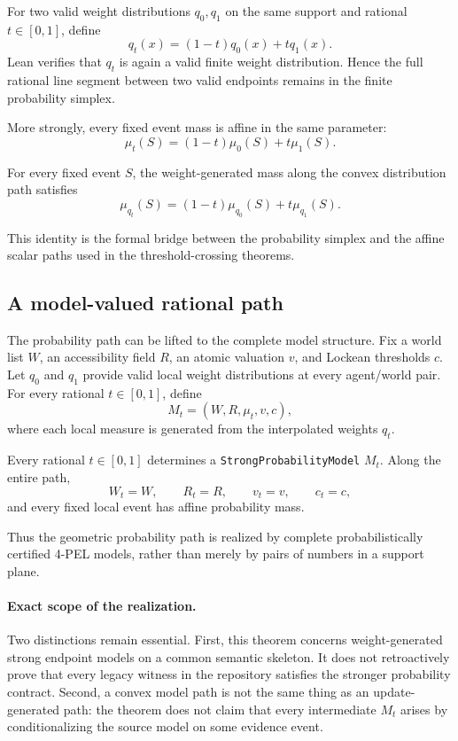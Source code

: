 For two valid weight distributions \(q_0,q_1\) on the same support and rational \(t\in[0,1]\), define
\[
  q_t(x)=(1-t)q_0(x)+tq_1(x).
\]
Lean verifies that \(q_t\) is again a valid finite weight distribution. Hence the full rational line segment between two valid endpoints remains in the finite probability simplex.

More strongly, every fixed event mass is affine in the same parameter:
\[
  \mu_t(S)
  =(1-t)\mu_0(S)+t\mu_1(S).
\]

\begin{theorem}
For every fixed event \(S\), the weight-generated mass along the convex distribution path satisfies
\[
  \mu_{q_t}(S)
  =(1-t)\mu_{q_0}(S)+t\mu_{q_1}(S).
\]
\statusverified
\end{theorem}

This identity is the formal bridge between the probability simplex and the affine scalar paths used in the threshold-crossing theorems.

\subsection{A model-valued rational path}

The probability path can be lifted to the complete model structure. Fix a world list \(W\), an accessibility field \(R\), an atomic valuation \(v\), and Lockean thresholds \(c\). Let \(q_0\) and \(q_1\) provide valid local weight distributions at every agent/world pair. For every rational \(t\in[0,1]\), define
\[
  M_t=(W,R,\mu_t,v,c),
\]
where each local measure is generated from the interpolated weights \(q_t\).

\begin{theorem}
Every rational \(t\in[0,1]\) determines a \texttt{StrongProbabilityModel} \(M_t\). Along the entire path,
\[
  W_t=W,
  \qquad
  R_t=R,
  \qquad
  v_t=v,
  \qquad
  c_t=c,
\]
and every fixed local event has affine probability mass.
\statusverified
\end{theorem}

Thus the geometric probability path is realized by complete probabilistically certified 4-PEL models, rather than merely by pairs of numbers in a support plane.

\paragraph{Exact scope of the realization.}
Two distinctions remain essential. First, this theorem concerns weight-generated strong endpoint models on a common semantic skeleton. It does not retroactively prove that every legacy witness in the repository satisfies the stronger probability contract. Second, a convex model path is not the same thing as an update-generated path: the theorem does not claim that every intermediate \(M_t\) arises by conditionalizing the source model on some evidence event.

